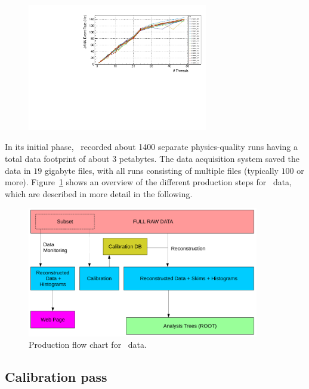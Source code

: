 \begin{figure}[h!]\centering
\includegraphics[width=0.7\textwidth]{figures/OfflineMonitor_PlotA.pdf}
\end{figure}

In its initial phase, \GX~recorded about 1400 separate physics-quality runs having a total data footprint of about 3 petabytes. The data acquisition system saved the data in $19$ gigabyte files, with all runs consisting of multiple files (typically $100$ or more). Figure~\ref{fig:production_overview} shows an overview of the different production steps for \GX~data, which are described in more detail in the following. 

\begin{figure}[h!]\centering
\includegraphics[width=0.9\textwidth]{figures/production_overview_calib_v2.pdf}
\caption[]{\label{fig:production_overview}Production flow chart for \GX~data.} 
\end{figure}

\subsection{Calibration pass \label{sec:reccalibration}}

